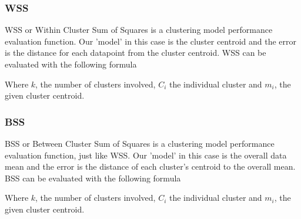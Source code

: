 \documentclass[11pt]{article}
\begin{document}
			\subsubsection*{WSS}
				WSS or  Within Cluster Sum of Squares is a clustering model performance evaluation function. Our 'model' in this case is the cluster centroid and the error is the distance for each datapoint from the cluster centroid. WSS can be evaluated with the following formula\cite{???}

				Where $k$, the number of clusters involved, $C_i$ the individual cluster and $m_i$, the given cluster centroid.
				\subsubsection*{BSS}
				BSS or  Between Cluster Sum of Squares is a clustering model performance evaluation function, just like WSS. Our 'model' in this case is the overall data mean and the error is the distance of each cluster's centroid to the overall mean. BSS can be evaluated with the following formula\cite{???}

				Where $k$, the number of clusters involved, $C_i$ the individual cluster and $m_i$, the given cluster centroid.
\end{document}
